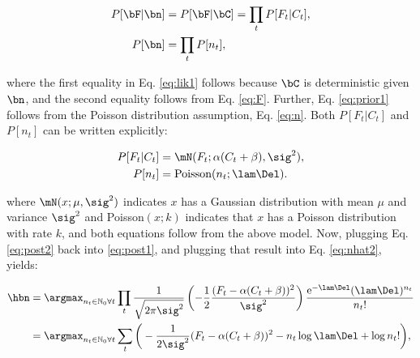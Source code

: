 \begin{subequations} \label{eq:post1}
\begin{align}
P[\bF | \bn]&= P[\bF | \bC] 	= \prod_t P[F_t | C_t], \label{eq:lik1} \\ 
P[\bn] 		&= \prod_t P[n_t], \label{eq:prior1}
\end{align}
\end{subequations}

\noindent where the first equality in Eq. \eqref{eq:lik1} follows because $\bC$ is deterministic given $\bn$, and the second equality follows from Eq. \eqref{eq:F}. Further, Eq. \eqref{eq:prior1} follows from the Poisson distribution assumption, Eq. \eqref{eq:n}.  Both $P[F_t | C_t]$ and $P[n_t]$ can be written explicitly:

\begin{subequations} \label{eq:post2}
\begin{align}
P[F_t | C_t] &= \mN(F_t; \alpha(C_t+\beta),\sig^2), \label{eq:lik2} \\
P[n_t] &= \text{Poisson}(n_t; \lam \Del). \label{eq:prior2} 
\end{align}
\end{subequations}

\noindent where $\mN(x;\mu,\sig^2)$ indicates $x$ has a Gaussian distribution with mean $\mu$ and variance $\sig^2$ and Poisson$(x;k)$ indicates that $x$ has a Poisson distribution with rate $k$, and both equations follow from the above model.  Now, plugging Eq. \eqref{eq:post2} back into \eqref{eq:post1}, and plugging that result into Eq. \eqref{eq:nhat2}, yields:

\begin{subequations}  \label{eq:obj}
\begin{align}
\hbn 	&= \anx \prod_t \frac{1}{\sqrt{2 \pi \sig^2}} \left(-\frac{1}{2}\frac{(F_t - \alpha (C_t + \beta))^2}{\sig^2}\right) \frac{\text{e}^{-\lam\Del} (\lam\Del)^{n_t}}{n_t!}
\label{eq:obj1}\\ &= \anx  \sum_t \bigg( -\frac{1}{2 \sig^2}(F_t - \alpha(C_t + \beta))^2  -  n_t \log \lam \Del + \log n_t! \bigg), \label{eq:logobj1}
\end{align} 
\end{subequations}

